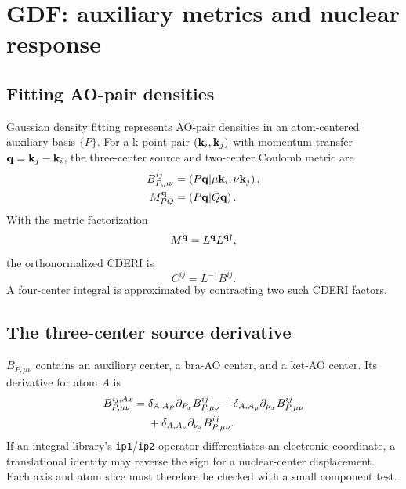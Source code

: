 \section{GDF: auxiliary metrics and nuclear response}
\label{sec:gdf}

\subsection{Fitting AO-pair densities}

Gaussian density fitting represents AO-pair densities in an atom-centered
auxiliary basis $\{P\}$.  For a k-point pair $(\mathbf{k}_i,\mathbf{k}_j)$ with momentum
transfer $\mathbf{q}=\mathbf{k}_j-\mathbf{k}_i$, the three-center source and two-center Coulomb
metric are
\begin{align}
  B_{P,\mu\nu}^{ij}
  &=\left(P\mathbf{q}\middle|\mu\mathbf{k}_i,\nu\mathbf{k}_j\right),
  \label{eq:gdf-three-center}\\
  M_{PQ}^{\mathbf{q}}
  &=\left(P\mathbf{q}\middle|Q\mathbf{q}\right).
  \label{eq:gdf-two-center}
\end{align}
With the metric factorization
\begin{equation}
  M^{\mathbf{q}}=L^{\mathbf{q}}L^{\mathbf{q}\dagger},
  \label{eq:gdf-cholesky}
\end{equation}
the orthonormalized CDERI is
\begin{equation}
  C^{ij}=L^{-1}B^{ij}.
  \label{eq:gdf-cderi}
\end{equation}
A four-center integral is approximated by contracting two such CDERI factors.

\subsection{The three-center source derivative}

$B_{P,\mu\nu}$ contains an auxiliary center, a bra-AO center, and a ket-AO
center.  Its derivative for atom $A$ is
\begin{align}
  B_{P,\mu\nu}^{ij,Ax}
  ={}&\delta_{A,A_P}\partial_{P_x}B_{P,\mu\nu}^{ij}
    +\delta_{A,A_\mu}\partial_{\mu_x}B_{P,\mu\nu}^{ij}
  \notag\\
   &+\delta_{A,A_\nu}\partial_{\nu_x}B_{P,\mu\nu}^{ij}.
  \label{eq:gdf-source-centers}
\end{align}
If an integral library's \texttt{ip1}/\texttt{ip2} operator differentiates an
electronic coordinate, a translational identity may reverse the sign for a
nuclear-center displacement.  Each axis and atom slice must therefore be
checked with a small component test.

